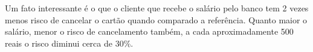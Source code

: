 \documentclass{article}\usepackage[]{graphicx}\usepackage[]{color}
\begin{document}
Um fato interessante é o que o cliente que recebe o salário pelo banco tem 2 vezes menos risco de cancelar o cartão quando comparado a referência. Quanto maior o salário, menor o risco de cancelamento também, a cada aproximadamente 500 reais o risco diminui cerca de 30\%.

\nocite{sobrev}

\end{document}
